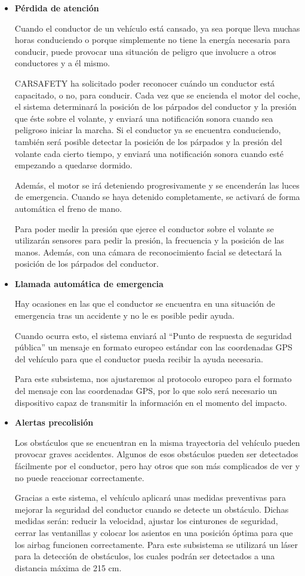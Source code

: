 \begin{itemize}[-]
\item \textbf{Pérdida de atención}
\par Cuando el conductor de un vehículo está cansado, ya sea porque lleva muchas horas conduciendo o porque simplemente no tiene la energía necesaria para conducir, puede provocar una situación de peligro que involucre a otros conductores y a él mismo.
\par CARSAFETY ha solicitado poder reconocer cuándo un conductor está capacitado, o no, para conducir. Cada vez que se encienda el motor del coche, el sistema determinará la posición de los párpados del conductor y la presión que éste sobre el volante, y enviará una notificación sonora cuando sea peligroso iniciar la marcha. Si el conductor ya se encuentra conduciendo, también será posible detectar la posición de los párpados y la presión del volante cada cierto tiempo, y enviará una notificación sonora cuando esté empezando a quedarse dormido.
\par Además, el motor se irá deteniendo progresivamente y se encenderán las luces de emergencia. Cuando se haya detenido completamente, se activará de forma automática el freno de mano.
\par Para poder medir la presión que ejerce el conductor sobre el volante se utilizarán sensores para pedir la presión, la frecuencia y la posición de las manos. Además, con una cámara de reconocimiento facial se detectará la posición de los párpados del conductor.
\item \textbf{Llamada automática de emergencia}
\par Hay ocasiones en las que el conductor se encuentra en una situación de emergencia tras un accidente y no le es posible pedir ayuda.
\par Cuando ocurra esto, el sistema enviará al “Punto de respuesta de seguridad pública” un mensaje en formato europeo estándar con las coordenadas GPS del vehículo para que el conductor pueda recibir la ayuda necesaria.
\par Para este subsistema, nos ajustaremos al protocolo europeo para el formato del mensaje con las coordenadas GPS, por lo que solo será necesario un dispositivo capaz de transmitir la información en el momento del impacto.
\item \textbf{Alertas precolisión}
\par Los obstáculos que se encuentran en la misma trayectoria del vehículo pueden provocar graves accidentes. Algunos de esos obstáculos pueden ser detectados fácilmente por el conductor, pero hay otros que son más complicados de ver y no puede reaccionar correctamente.
\par Gracias a este sistema, el vehículo aplicará unas medidas preventivas para mejorar la seguridad del conductor cuando se detecte un obstáculo. Dichas medidas serán: reducir la velocidad, ajustar los cinturones de seguridad, cerrar las ventanillas y colocar los asientos en una posición óptima para que los airbag funcionen correctamente. Para este subsistema se utilizará un láser para la detección de obstáculos, los cuales podrán ser detectados a una distancia máxima de 215 cm.
\end{itemize}


